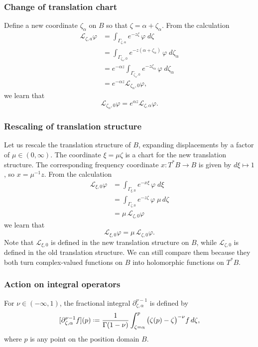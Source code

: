 \documentclass{article}
\theoremstyle{definition}
\newcommand{\maps}{\colon}
\newcommand*{\defeq}{\mathrel{\vcenter{\baselineskip0.5ex \lineskiplimit0pt
                     \hbox{\scriptsize.}\hbox{\scriptsize.}}}%
                     =}
\newcommand{\laplace}{\mathcal{L}}
\begin{document}
\subsubsection{Change of translation chart}\label{translation}
Define a new coordinate $\zeta_\alpha$ on $B$ so that $\zeta = \alpha + \zeta_\alpha$. From the calculation
\begin{align*}
\laplace_{\zeta, a} \varphi & = \int_{\Gamma_{\zeta, \alpha}} e^{-z \zeta}\,\varphi\;d\zeta \\
& = \int_{\Gamma_{\zeta_\alpha, 0}} e^{-z(\alpha + \zeta_\alpha)}\,\varphi\;d\zeta_\alpha \\
& = e^{-\alpha z} \int_{\Gamma_{\zeta_\alpha, 0}} e^{-z\zeta_\alpha}\,\varphi\;d\zeta_\alpha \\
& = e^{-\alpha z} \laplace_{\zeta_\alpha, 0} \varphi,
\end{align*}
we learn that
\begin{equation}
    \label{change-chart}
    \laplace_{\zeta_\alpha, 0} \varphi = e^{\alpha z} \laplace_{\zeta, \alpha} \varphi.
\end{equation}

\subsubsection{Rescaling of translation structure}

Let us rescale the translation structure of $B$, expanding displacements by a factor of $\mu \in (0, \infty)$. The coordinate $\xi = \mu\zeta$ is a chart for the new translation structure. The corresponding frequency coordinate $x \maps T^*B \to B$ is given by $d\xi \mapsto 1$, so $x = \mu^{-1} z$. From the calculation
\begin{align*}
\laplace_{\xi, 0} \varphi & = \int_{\Gamma_{\xi, 0}} e^{-x\xi}\,\varphi\;d\xi \\
& = \int_{\Gamma_{\zeta, 0}} e^{-z \zeta}\,\varphi\;\mu\,d\zeta \\
& = \mu\,\laplace_{\zeta, 0} \varphi
\end{align*}
we learn that
\[ \laplace_{\xi, 0} \varphi = \mu\,\laplace_{\zeta, 0} \varphi. \]
Note that $\laplace_{\xi, 0}$ is defined in the new translation structure on $B$, while $\laplace_{\zeta, 0}$ is defined in the old translation structure. We can still compare them because they both turn complex-valued functions on $B$ into holomorphic functions on $T^*B$.

\subsubsection{Action on integral operators}\label{L-int-op}
For $\nu \in (-\infty, 1)$, the fractional integral $\partial^{\nu-1}_{\zeta, \alpha}$ is defined by
\[ [\partial^{\nu-1}_{\zeta, \alpha} f](p) \defeq \frac{1}{\Gamma(1-\nu)} \int_{\zeta = \alpha}^p \big(\zeta(p)-\zeta\big)^{-\nu} f\,d\zeta, \]
where $p$ is any point on the position domain $B$. 
\end{document}
